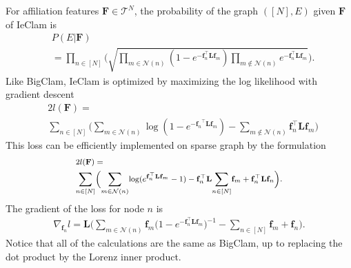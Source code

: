 \documentclass[letterpaper]{article} %
\newcommand{\sumgraph}{\underset{n \in [N]}{\sum}}
\def \sumgraphu {\underset{n\in [N]}{ \sum}}
\def \sumneighbors {\underset {m\in{\mathcal{N}(n)}}{\sum}}
\def \sumstrangers{\underset {m\notin{\mathcal{N}(n)}}{\sum}}
\newcommand{\flf}{\mathbf{f}_n^\top   \mathbf{L} \mathbf{f}_m}
\begin{document}
For affiliation features $\mathbf{F}\in \mathcal{T}^N$, the probability of the graph $([N],E)$ given $\mathbf{F}$ of IeClam is
\begingroup
\footnotesize
\begin{equation}
\begin{aligned}
   &  P(E|\mathbf{F}) \\
   & = \prod_{n \in [N]}\Bigg(
        \sqrt{\prod_{m \in \mathcal{N}(n)}(1-e^{-\mathbf{f}_n^\top  \mathbf{L} \mathbf{f}_m})\prod_{m \notin \mathcal{N}(n)} e^{-\mathbf{f}_n^\top  \mathbf{L} \mathbf{f}_m}}\Bigg).
\end{aligned}
\label{eqn:IeClam_prob}
\end{equation}
\endgroup
Like BigClam, IeClam is optimized by maximizing the log likelihood with gradient descent
\begin{equation}
\begin{aligned}
   &  2 l(\mathbf{F}) =
    \\ &\sumgraphu \Big(\sumneighbors{}\log(1 - e^{-{\mathbf{f}_n}^\top  \mathbf{L} \mathbf{f}_m})  -   \sumstrangers{}  \mathbf{f}_n ^\top  \mathbf{L} \mathbf{f}_m\Big)
    \end{aligned}
\label{eqn:IeClam_loss}
\end{equation}
This loss can be efficiently implemented on sparse graph by the formulation
\begingroup
\begin{equation}
\footnotesize
\begin{aligned}
\label{eqn:loss_reparam_ie}
   &  2l(\mathbf{F})=\\
   & \sumgraphu \Big(\sumneighbors{\log(e^{\flf} - 1)}  - \mathbf{f}_n^\top  \mathbf{L}{\sumgraph{\mathbf{f}_m}} + \mathbf{f}_n^\top  \mathbf{L}\mathbf{f}_n\Big).
\end{aligned}
\end{equation}
\endgroup
The gradient of the loss for node $n$ is
\begin{align}
\label{eqn:BCupdate_ie}
    \nabla_{\mathbf{f}_n}l = 
   \mathbf{L}\bigg( \sumneighbors{\mathbf{f}_m \big(1-e^{-\flf}
    \big)^{-1}} - \sumgraph{\mathbf{f}_m} + \mathbf{f}_n \bigg).
\end{align}
Notice that all of the calculations are the same as BigClam, up to replacing the dot product by the Lorenz inner product.

\end{document}
